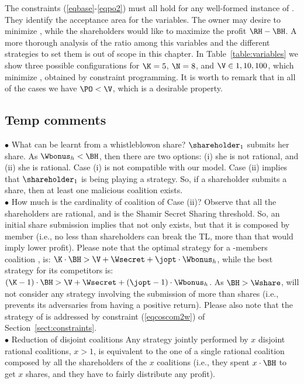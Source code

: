 The constraints (\ref{eqbase}-\ref{eqpo2}) must all hold for any well-formed instance of \shortname. 
They identify the acceptance area for the variables. 
The owner may desire to minimize \PO, while the shareholders would like to maximize the profit $\RH - \BH$.
A more thorough analysis of the ratio among this variables and the different strategies to set them is out of scope in this chapter.
In Table~\ref{table:variables} we show three possible configurations for $\K=5$, $\N=8$, and $\V \in {1, 10, 100}$, which minimize \PO, obtained by constraint programming.
It is worth to remark that in all of the cases we have $\PO < \V$, which is a desirable property.


\subsection{Temp comments}
$\bullet$ What can be learnt from a whistleblowon share?
\newline
$\shareholder_{1}$ submits her share. 
As $\Wbonus_h < \BH$, then there are two options: (i) she is not rational, and (ii) she is rational.
Case (i) is not compatible with our model.
Case (ii) implies that $\shareholder_{1}$ is being playing a strategy.
So, if a shareholder submits a share, then at least one malicious coalition \coalition exists.  
\\
$\bullet$ How much is the cardinality of coalition of Case (ii)?
\newline
Observe that all the shareholders are rational, and \K is the Shamir Secret Sharing threshold.
So, an initial share submission implies that \coalition not only exists, but that it is composed by \K member (i.e., no less than \K shareholders can break the TL, more than that would imply lower profit).
\newline
Please note that the optimal strategy for a \K-members coalition \coalition, is:
$\K \cdot \BH > \V + \Wsecret + \jopt \cdot \Wbonus_h $,
while the best strategy for its competitors is:
$
\left( \K - 1 \right) \cdot \BH > \V + \Wsecret + \left( \jopt - 1 \right) \cdot \Wbonus_h
$.
As $\BH > \Wshare$, \coalition will not consider any strategy involving the submission of more than \jopt shares (i.e., \coalition prevents its adversaries from having a positive return).
Please also note that the strategy of \coalition is addressed by constraint (\ref{eqcoscom2w}) of Section~\ref{sect:constraints}.
\\
$\bullet$ Reduction of disjoint coalitions
\newline
Any strategy jointly performed by $x$ disjoint rational coalitions, $x>1$, is equivalent to the one of a single rational coalition composed by all the shareholders of the $x$ coalitions (i.e., they spent $x \cdot \BH$ to get $x$ shares, and they have to fairly distribute any profit). 
